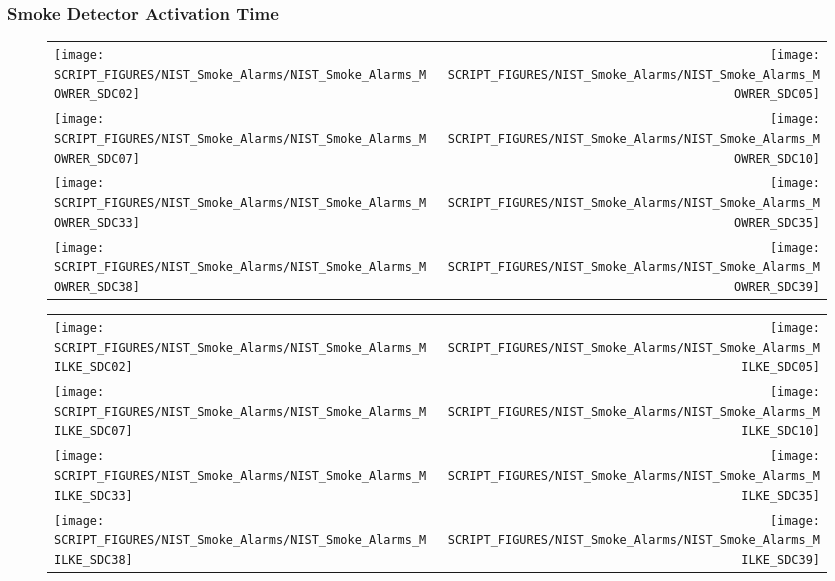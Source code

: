 \clearpage

\subsubsection{Smoke Detector Activation Time}

\begin{figure}[!ht]
\begin{tabular*}{\textwidth}{l@{\extracolsep{\fill}}r}
\texttt{[image: SCRIPT\_FIGURES/NIST\_Smoke\_Alarms/NIST\_Smoke\_Alarms\_MOWRER\_SDC02]} &
\texttt{[image: SCRIPT\_FIGURES/NIST\_Smoke\_Alarms/NIST\_Smoke\_Alarms\_MOWRER\_SDC05]} \\
\texttt{[image: SCRIPT\_FIGURES/NIST\_Smoke\_Alarms/NIST\_Smoke\_Alarms\_MOWRER\_SDC07]} &
\texttt{[image: SCRIPT\_FIGURES/NIST\_Smoke\_Alarms/NIST\_Smoke\_Alarms\_MOWRER\_SDC10]} \\
\texttt{[image: SCRIPT\_FIGURES/NIST\_Smoke\_Alarms/NIST\_Smoke\_Alarms\_MOWRER\_SDC33]} &
\texttt{[image: SCRIPT\_FIGURES/NIST\_Smoke\_Alarms/NIST\_Smoke\_Alarms\_MOWRER\_SDC35]} \\
\texttt{[image: SCRIPT\_FIGURES/NIST\_Smoke\_Alarms/NIST\_Smoke\_Alarms\_MOWRER\_SDC38]} &
\texttt{[image: SCRIPT\_FIGURES/NIST\_Smoke\_Alarms/NIST\_Smoke\_Alarms\_MOWRER\_SDC39]}
\end{tabular*}
\end{figure}

\begin{figure}[!ht]
\begin{tabular*}{\textwidth}{l@{\extracolsep{\fill}}r}
\texttt{[image: SCRIPT\_FIGURES/NIST\_Smoke\_Alarms/NIST\_Smoke\_Alarms\_MILKE\_SDC02]} &
\texttt{[image: SCRIPT\_FIGURES/NIST\_Smoke\_Alarms/NIST\_Smoke\_Alarms\_MILKE\_SDC05]} \\
\texttt{[image: SCRIPT\_FIGURES/NIST\_Smoke\_Alarms/NIST\_Smoke\_Alarms\_MILKE\_SDC07]} &
\texttt{[image: SCRIPT\_FIGURES/NIST\_Smoke\_Alarms/NIST\_Smoke\_Alarms\_MILKE\_SDC10]} \\
\texttt{[image: SCRIPT\_FIGURES/NIST\_Smoke\_Alarms/NIST\_Smoke\_Alarms\_MILKE\_SDC33]} &
\texttt{[image: SCRIPT\_FIGURES/NIST\_Smoke\_Alarms/NIST\_Smoke\_Alarms\_MILKE\_SDC35]} \\
\texttt{[image: SCRIPT\_FIGURES/NIST\_Smoke\_Alarms/NIST\_Smoke\_Alarms\_MILKE\_SDC38]} &
\texttt{[image: SCRIPT\_FIGURES/NIST\_Smoke\_Alarms/NIST\_Smoke\_Alarms\_MILKE\_SDC39]}
\end{tabular*}
\end{figure}

